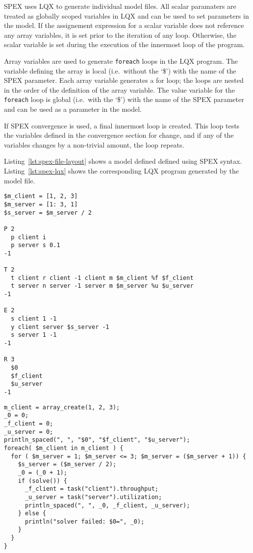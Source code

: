 SPEX uses LQX to generate individual model files.  All scalar paramaters are treated as globally
scoped variables in LQX and can be used to set parameters in the model.  If the assignement expression for a
scalar variable does not reference any array variables, it is set prior to the iteration of any loop.
Otherwise, the scalar variable is set during the execution of the innermost loop of the program.

Array variables are used to generate \texttt{foreach} loops in the LQX program.  The variable defining the
array is local (i.e.\ without the `\$') with the name of the SPEX parameter.  Each array variable generates
a for loop; the loops are nested in the order of the definition of the array variable.  The value variable
for the \texttt{foreach} loop is global (i.e.\ with the `\$') with the name of the SPEX parameter and can be
used as a parameter in the model.

If SPEX convergence is used, a final innermost loop is created.  This loop tests the variables defined in
the convergence section for change, and if any of the variables changes by a non-trivial amount, the loop
repeats.

Listing~\ref{lst:spex-file-layout} shows a model defined defined using SPEX syntax.
Listing~\ref{lst:spex-lqx} shows the corresponding LQX program generated by the model file.  

\lstset{language=LQN,basicstyle=\ttfamily,numbersep=10pt,firstnumber=1}
\begin{lstlisting}[float,caption={SPEX file layout.},label=lst:spex-file-layout]
$m_client = [1, 2, 3]
$m_server = [1: 3, 1]
$s_server = $m_server / 2

P 2
  p client i
  p server s 0.1
-1

T 2
  t client r client -1 client m $m_client %f $f_client
  t server n server -1 server m $m_server %u $u_server
-1

E 2
  s client 1 -1
  y client server $s_server -1
  s server 1 -1
-1

R 3
  $0
  $f_client
  $u_server
-1
\end{lstlisting}

\lstset{language=LQX,basicstyle=\ttfamily,numbersep=10pt,firstnumber=1,texcl=false}
\begin{lstlisting}[float,caption={LQX Program for SPEX input.},label=lst:spex-lqx]
m_client = array_create(1, 2, 3);
_0 = 0;
_f_client = 0;
_u_server = 0;
println_spaced(", ", "$0", "$f_client", "$u_server");
foreach( $m_client in m_client ) { 
  for ( $m_server = 1; $m_server <= 3; $m_server = ($m_server + 1)) {
    $s_server = ($m_server / 2);
    _0 = (_0 + 1);
    if (solve()) {
      _f_client = task("client").throughput;
      _u_server = task("server").utilization;
      println_spaced(", ", _0, _f_client, _u_server);
    } else {
      println("solver failed: $0=", _0);
    }
  }
}
\end{lstlisting}





